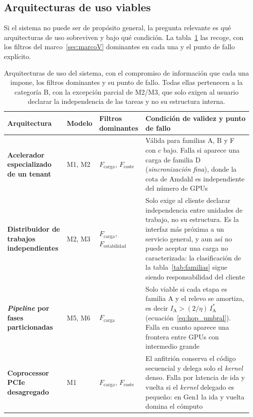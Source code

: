 \documentclass[a4paper,11pt]{article}
\begin{document}
\subsection*{Arquitecturas de uso viables}

Si el sistema no puede ser de propósito general, la pregunta relevante es qué arquitecturas de uso sobreviven y bajo qué
condición. La tabla~\ref{tab:arquitecturas} las recoge, con los filtros del marco~\ref{sec:marcoV} dominantes en cada una y el
punto de fallo explícito.

\begin{table}[t]
\centering
\footnotesize
\caption{Arquitecturas de uso del sistema, con el compromiso de información que cada una impone, los filtros dominantes y su
punto de fallo. Todas ellas pertenecen a la categoría B, con la excepción parcial de M2/M3, que solo exigen al usuario declarar la
independencia de las tareas y no su estructura interna.}
\label{tab:arquitecturas}
\begin{tabular}{>{\raggedright\arraybackslash}p{2.8cm} >{\raggedright\arraybackslash}p{2.6cm} >{\raggedright\arraybackslash}p{3.4cm} >{\raggedright\arraybackslash}p{5.4cm}}
\toprule
\textbf{Arquitectura} & \textbf{Modelo} & \textbf{Filtros dominantes} & \textbf{Condición de validez y punto de fallo} \\
\midrule
\textbf{Acelerador especializado de un tenant} & M1, M2 & $F_{\text{carga}}$, $F_{\text{coste}}$ & Válida para familias A, B y F con $c$ bajo. Falla si aparece una carga de familia D (\emph{sincronización fina}), donde la cota de Amdahl es independiente del número de GPUs \\
\textbf{Distribuidor de trabajos independientes} & M2, M3 & $F_{\text{carga}}$, $F_{\text{estabilidad}}$ & Solo exige al cliente declarar independencia entre unidades de trabajo, no su estructura. Es la interfaz más próxima a un servicio general, y aun así no puede aceptar una carga no caracterizada: la clasificación de la tabla~\ref{tab:familias} sigue siendo responsabilidad del cliente \\
\textbf{\textit{Pipeline} por fases particionadas} & M5, M6 & $F_{\text{carga}}$ & Solo viable si cada etapa es familia A y el relevo se amortiza, es decir $I_{\text{A}} > (2/\eta)\,I_{\text{A}}^*$ (ecuación~\eqref{eq:hop_umbral}). Falla en cuanto aparece una frontera entre GPUs con intermedio grande \\
\textbf{Coprocessor PCIe desagregado} & M1 & $F_{\text{carga}}$, $F_{\text{coste}}$ & El anfitrión conserva el código secuencial y delega solo el \emph{kernel} denso. Falla por latencia de ida y vuelta si el \emph{kernel} delegado es pequeño: en Gen1 la ida y vuelta domina el cómputo \\

\end{tabular}
\end{table}
\end{document}
